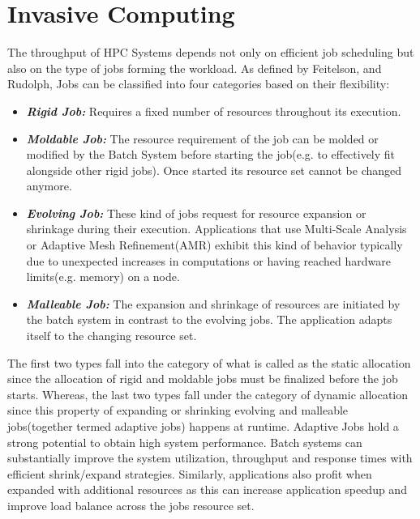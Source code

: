 \section{Invasive Computing}
The throughput of HPC Systems depends not only on efficient job scheduling but also on the type of jobs forming the workload. As defined by Feitelson, and Rudolph, Jobs can be classified into four categories based on their flexibility:
\begin{itemize}
\item \textbf{\textit{Rigid Job:}} Requires a fixed number of resources throughout its execution.
\item \textbf{\textit{Moldable Job: }} The resource requirement of the job can be molded or modified by the Batch System before starting the job(e.g. to effectively fit alongside other rigid jobs). Once started its resource set cannot be changed anymore.
\item \textbf{\textit{Evolving Job: }} These kind of jobs request for resource expansion or shrinkage during their execution. Applications that use Multi-Scale Analysis or Adaptive Mesh Refinement(AMR) exhibit this kind of behavior typically due to unexpected increases in computations or having reached hardware limits(e.g. memory) on a node.
\item \textbf{\textit{Malleable Job: }} The expansion and shrinkage of resources are initiated by the batch system in contrast to the evolving jobs. The application adapts itself to the changing resource set.
\end{itemize}
The first two types fall into the category of what is called as the static allocation since the allocation of rigid and moldable jobs must be finalized before the job starts. Whereas, the last two types fall under the category of dynamic allocation since this property of expanding or shrinking evolving and malleable jobs(together termed adaptive jobs) happens at runtime. Adaptive Jobs hold a strong potential to obtain high system performance. Batch systems can substantially improve the system utilization, throughput and response times with efficient shrink/expand strategies. Similarly, applications also profit when expanded with additional resources as this can increase application speedup and improve load balance across the job\textquotesingle s resource set.\\ \par
\noindent
